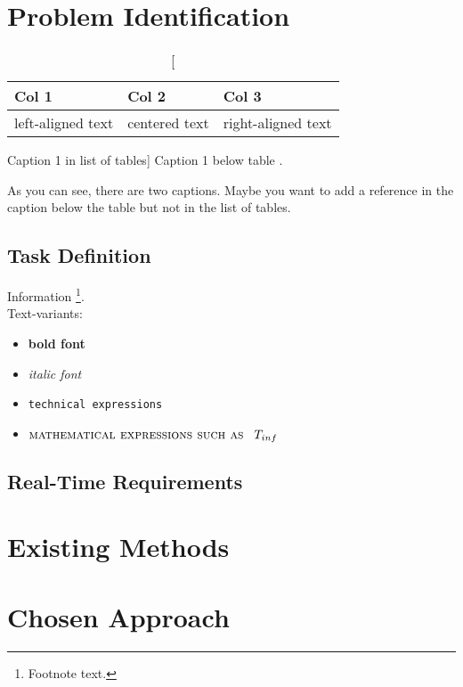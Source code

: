 

\section{Problem Identification}
\label{sec:concept_problemident}

\begin{table}[h!]
 \centering
 \begin{tabular}{ L{3cm} C{4cm} R{3cm} } 
  \toprule
    \textbf{Col 1} & 
    \textbf{Col 2} & 
    \textbf{Col 3} \\
  \midrule
    left-aligned text & 
    centered text & 
    right-aligned text \\
  \bottomrule
 \end{tabular}
 \caption
 [Caption 1 in list of tables]
 {Caption 1 below table \cite{feynmf}.}
 \label{tab:table1}
\end{table}

As you can see, there are two captions. Maybe you want to add a reference in the caption below the table but not in the list of tables.

\subsection{Task Definition}
Information \footnote{Footnote text.}. \\
Text-variants:
\begin{itemize}
\item \textbf{bold font} 
\item \textit{italic font} 
\item \texttt{technical expressions} 
\item $\textsc{mathematical expressions such as} \hspace{3mm} T_{inf}$
\end{itemize}

\subsection{Real-Time Requirements}


\vspace{10mm}

\section{Existing Methods} 

\section{Chosen Approach}


